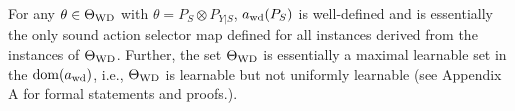 For any $\theta \in \Theta_{\mathrm{WD}}$ with $\theta = P_S\otimes P_{Y|S}$, $a_{\mathrm{wd}}(P_S)$ is well-defined and is essentially the only sound action selector map defined for all instances derived from the instances of $\Theta_{\mathrm{WD}}$. Further, the set $\Theta_{\mathrm{WD}}$ is essentially a maximal learnable set in the  $\mathrm{dom}(a_{\mathrm{wd}})$, i.e., $\Theta_{\mathrm{WD}}$ is learnable but not uniformly learnable (see Appendix A for formal statements and proofs.).

